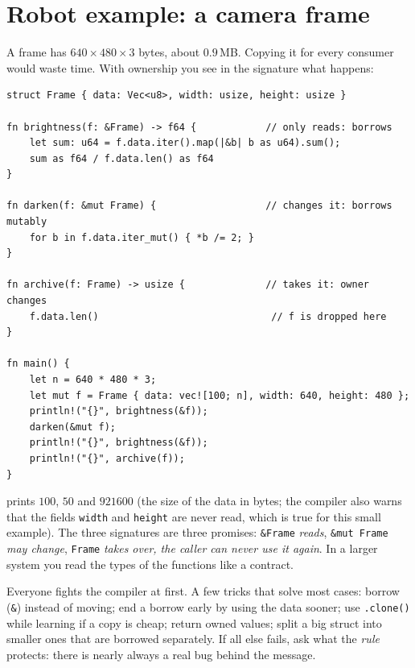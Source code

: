 \section*{Robot example: a camera frame}
A frame has $640\times480\times3$ bytes, about $0.9$\,MB. Copying it for every consumer would waste time. With ownership you see in the signature what happens:
\begin{verbatim}
struct Frame { data: Vec<u8>, width: usize, height: usize }

fn brightness(f: &Frame) -> f64 {            // only reads: borrows
    let sum: u64 = f.data.iter().map(|&b| b as u64).sum();
    sum as f64 / f.data.len() as f64
}

fn darken(f: &mut Frame) {                   // changes it: borrows mutably
    for b in f.data.iter_mut() { *b /= 2; }
}

fn archive(f: Frame) -> usize {              // takes it: owner changes
    f.data.len()                              // f is dropped here
}

fn main() {
    let n = 640 * 480 * 3;
    let mut f = Frame { data: vec![100; n], width: 640, height: 480 };
    println!("{}", brightness(&f));
    darken(&mut f);
    println!("{}", brightness(&f));
    println!("{}", archive(f));
}
\end{verbatim}
prints $100$, $50$ and $921600$ (the size of the data in bytes; the compiler also warns that the fields \verb!width! and \verb!height! are never read, which is true for this small example). The three signatures are three promises: \verb!&Frame! \emph{reads}, \verb!&mut Frame! \emph{may change}, \verb!Frame! \emph{takes over, the caller can never use it again}. In a larger system you read the types of the functions like a contract.

\begin{aibox}
Everyone fights the compiler at first. A few tricks that solve most cases: borrow (\verb!&!) instead of moving; end a borrow early by using the data sooner; use \verb!.clone()! while learning if a copy is cheap; return owned values; split a big struct into smaller ones that are borrowed separately. If all else fails, ask what the \emph{rule} protects: there is nearly always a real bug behind the message.
\end{aibox}

